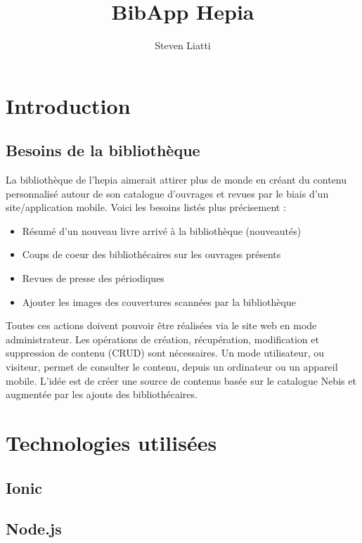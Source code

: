 \documentclass[a4paper, 12pt]{article}
\begin{document}
\title{BibApp Hepia} 
\author{Steven Liatti} 
\maketitle
\newpage

\tableofcontents
\listoffigures
\newpage


\section{Introduction}
\subsection{Besoins de la bibliothèque}
La bibliothèque de l'hepia aimerait attirer plus de monde en créant du contenu personnalisé autour de son 
catalogue d'ouvrages et revues par le biais d'un site/application mobile. Voici les besoins listés plus 
précisement :
\begin{itemize}
	\item Résumé d'un nouveau livre arrivé à la bibliothèque (nouveautés)
	\item Coups de coeur des bibliothécaires sur les ouvrages présents
	\item Revues de presse des périodiques
	\item Ajouter les images des couvertures scannées par la bibliothèque
\end{itemize}
Toutes ces actions doivent pouvoir être réalisées via le site web en mode administrateur. Les opérations de 
création, récupération, modification et suppression de contenu (CRUD) sont nécessaires. Un mode utilisateur, ou visiteur, 
permet de consulter le contenu, depuis un ordinateur ou un appareil mobile. L'idée est de créer une source 
de contenus basée sur le catalogue Nebis et augmentée par les ajouts des bibliothécaires.

\section{Technologies utilisées}
\subsection{Ionic}
\subsection{Node.js}
\end{document}
